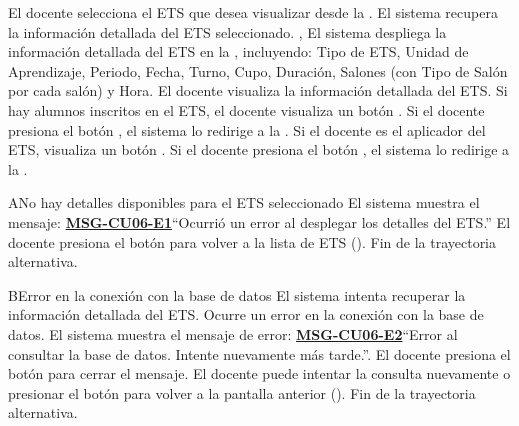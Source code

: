 \begin{UCtrayectoria}
	\UCpaso[\UCactor] El docente selecciona el ETS que desea visualizar desde la .
	\UCpaso[\UCsist] El sistema recupera la información detallada del ETS seleccionado. , 
	\UCpaso El sistema despliega la información detallada del ETS en la , incluyendo: Tipo de ETS, Unidad de Aprendizaje, Periodo, Fecha, Turno, Cupo, Duración, Salones (con Tipo de Salón por cada salón) y Hora.
	\UCpaso[\UCactor] El docente visualiza la información detallada del ETS.
	\UCpaso Si hay alumnos inscritos en el ETS, el docente visualiza un botón .
	\UCpaso[\UCactor] Si el docente presiona el botón , el sistema lo redirige a la .
	\UCpaso Si el docente es el aplicador del ETS, visualiza un botón .
	\UCpaso[\UCactor] Si el docente presiona el botón , el sistema lo redirige a la .
\end{UCtrayectoria}
\begin{UCtrayectoriaA}{A}{No hay detalles disponibles para el ETS seleccionado}
	\UCpaso El sistema muestra el mensaje: \textbf{\hyperref[msg:CU06-E1]{MSG-CU06-E1}}{``Ocurrió un error al desplegar los detalles del ETS.''}
	\UCpaso[\UCactor] El docente presiona el botón  para volver a la lista de ETS ().
	\UCpaso Fin de la trayectoria alternativa.
\end{UCtrayectoriaA}

\begin{UCtrayectoriaA}{B}{Error en la conexión con la base de datos}
	\UCpaso El sistema intenta recuperar la información detallada del ETS.
	\UCpaso Ocurre un error en la conexión con la base de datos.
	\UCpaso El sistema muestra el mensaje de error: \textbf{\hyperref[msg:CU06-E2]{MSG-CU06-E2}}{``Error al consultar la base de datos. Intente nuevamente más tarde.''}.
	\UCpaso[\UCactor] El docente presiona el botón  para cerrar el mensaje.
	\UCpaso[\UCactor] El docente puede intentar la consulta nuevamente o presionar el botón  para volver a la pantalla anterior ().
	\UCpaso Fin de la trayectoria alternativa.
\end{UCtrayectoriaA}


